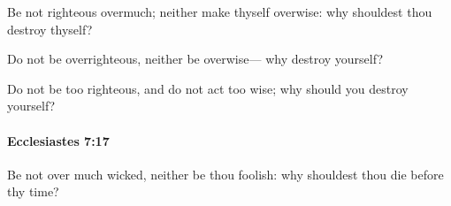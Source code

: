 			\begin{versebox}
					\item[BHS] 
					\item[LXX] 
					\item[ASV] Be not righteous overmuch; neither make thyself overwise: why shouldest thou destroy thyself?
					\item[NIV] Do not be overrighteous, neither be overwise— why destroy yourself?
					\item[NRSV] Do not be too righteous, and do not act too wise; why should you destroy yourself?
			\end{versebox}

		\paragraph{Ecclesiastes 7:17} %
			\label{ECCLESIASTES-7-17}

			Be not over much wicked, neither be thou foolish: why shouldest thou die before thy time?

